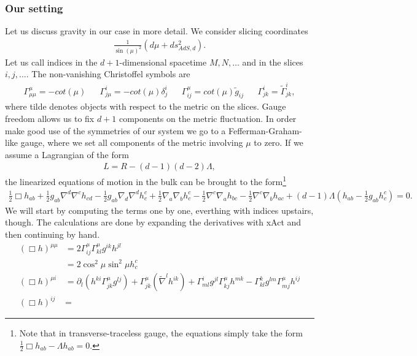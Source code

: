 \subsubsection{Our setting}
Let us discuss gravity in our case in more detail. We consider slicing coordinates
\begin{align}
\frac{1}{\sin(\mu)^2} \left(d\mu + ds^2_{AdS, d}\right).
\end{align}
Let us call indices in the $d+1$-dimensional spacetime $M,N,\dots$ and in the slices $i,j,\dots$. The non-vanishing Christoffel symbols are
\begin{align}
\Gamma^\mu_{\mu\mu} = -cot(\mu) && \Gamma^i_{j\mu} = -cot(\mu) \delta^i_j && \Gamma^\mu_{ij} = cot(\mu) \tilde g_{ij} && \Gamma^i_{jk} = \tilde \Gamma^i_{jk},
\end{align}
where tilde denotes objects with respect to the metric on the slices.
Gauge freedom allows us to fix $d+1$ components on the metric fluctuation. In order make good use of the symmetries of our system we go to a Fefferman-Graham-like gauge, where we set all components of the metric involving $\mu$ to zero.
If we assume a Lagrangian of the form
\begin{align}
L = R - (d-1)(d-2) \Lambda,
\end{align}
the linearized equations of motion in the bulk can be brought to the form\footnote{Note that in transverse-traceless gauge, the equations simply take the form $\frac 1 2 \Box h_{ab} - \Lambda h_{ab} = 0$.}
\begin{align}
\frac 1 2 \Box h_{ab} + \frac 1 2 g_{ab} \nabla^d \nabla^c h_{cd} - \frac 1 2 g_{ab} \nabla_d \nabla^d h^{c}_{c} + \frac 1 2 \nabla_a \nabla_b h^c_c - \frac 1 2 \nabla^c \nabla_a h_{bc}- \frac 1 2 \nabla^c \nabla_b h_{ac} + (d-1) \Lambda (h_{ab} - \frac 1 2 g_{ab} h^c_c) = 0.
\end{align}
We will start by computing the terms one by one, everthing with indices upstairs, though. The calculations are done by expanding the derivatives with xAct and then continuing by hand.
\begin{align}
(\Box h)^{\mu\mu} &= 2 \Gamma^{\mu}_{ij} \Gamma^\mu_{kl} g^{ik} h^{jl} \\
&= 2 \cos^2 \mu \sin^2 \mu h^c_c\\
(\Box h)^{\mu i} &= \partial_l (h^{ki} \Gamma^\mu_{jk} g^{lj}) + \Gamma^\mu_{jk} (\tilde \nabla^l h^{ik}) + \Gamma^i_{ml} g^{jl} \Gamma^\mu_{kj} h^{mk} - \Gamma^k_{kl} g^{lm} \Gamma^\mu_{mj} h^{ij}\\
(\Box h)^{ij} &= 
\end{align}
